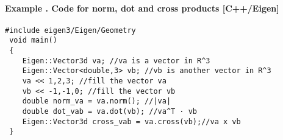 \paragraph{Example \theexamplecounter. Code for norm, dot and cross products [C++/Eigen]}

\begin{mdframed}
\begin{verbatim} 
#include eigen3/Eigen/Geometry 
 void main() 
 { 
    Eigen::Vector3d va; //va is a vector in R^3
    Eigen::Vector<double,3> vb; //vb is another vector in R^3
    va << 1,2,3; //fill the vector va
    vb << -1,-1,0; //fill the vector vb
    double norm_va = va.norm(); //|va|
    double dot_vab = va.dot(vb); //va^T · vb
    Eigen::Vector3d cross_vab = va.cross(vb);//va x vb 
 }  
\end{verbatim}
\end{mdframed}


